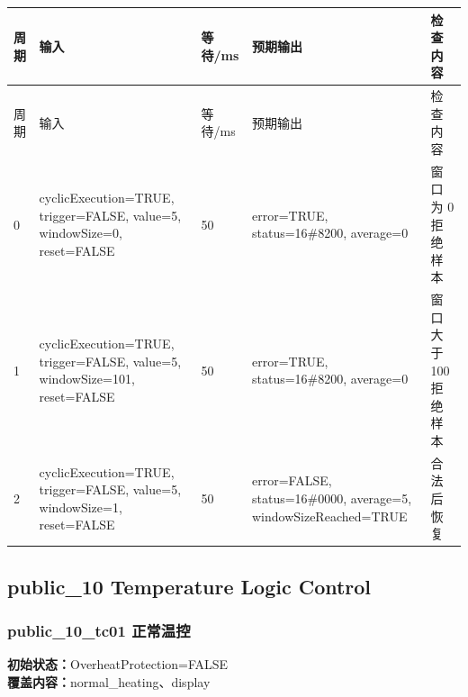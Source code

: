 \begin{longtable}{L{1.0cm}L{4.7cm}L{1.4cm}L{4.0cm}L{2.1cm}}

\toprule

周期 & 输入 & 等待/ms & 预期输出 & 检查内容\\

\midrule

\endfirsthead

\toprule

周期 & 输入 & 等待/ms & 预期输出 & 检查内容\\

\midrule

\endhead

0 & cyclicExecution=TRUE, trigger=FALSE, value=5, windowSize=0, reset=FALSE & 50 & error=TRUE, status=16\#8200, average=0 & 窗口为 0 拒绝样本\\

1 & cyclicExecution=TRUE, trigger=FALSE, value=5, windowSize=101, reset=FALSE & 50 & error=TRUE, status=16\#8200, average=0 & 窗口大于 100 拒绝样本\\

2 & cyclicExecution=TRUE, trigger=FALSE, value=5, windowSize=1, reset=FALSE & 50 & error=FALSE, status=16\#0000, average=5, windowSizeReached=TRUE & 合法后恢复\\

\bottomrule

\end{longtable}

\subsection{{\ttfamily public\_10} Temperature Logic Control}

\subsubsection{{\ttfamily public\_10\_tc01} 正常温控}

\noindent\textbf{初始状态：}OverheatProtection=FALSE\\

\textbf{覆盖内容：}normal\_heating、display

